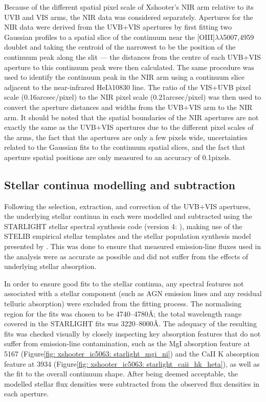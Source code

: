 Because of the different spatial pixel scale of Xshooter's NIR arm relative to its UVB and VIS arms, the NIR data was considered separately. Apertures for the NIR data were derived from the UVB+VIS apertures by first fitting two Gaussian profiles to a spatial slice of the continuum near the [OIII]$\lambda\lambda$5007,4959 doublet and taking the centroid of the narrowest to be the position of the continuum peak along the slit --- the distances from the centre of each UVB+VIS aperture to this continuum peak were then calculated. The same procedure was used to identify the continuum peak in the NIR arm using a continuum slice adjacent to the near-infrared HeI$\lambda$10830 line. The ratio of the VIS+UVB pixel scale (0.16\;arcsec/pixel) to the NIR pixel scale (0.21\;arcsec/pixel) was then used to convert the aperture distances and widths from the UVB+VIS arm to the NIR arm. It should be noted that the spatial boundaries of the NIR apertures are not exactly the same as the UVB+VIS apertures due to the different pixel scales of the arms, the fact that the apertures are only a few pixels wide, uncertainties related to the Gaussian fits to the continuum spatial slices, and the fact that aperture spatial positions are only measured to an accuracy of 0.1\;pixels.

\subsection{Stellar continua modelling and subtraction}
\label{section: xshooter_ic_5063: observations_and_data_reduction: starlight}

Following the selection, extraction, and correction of the UVB+VIS apertures, the underlying stellar continua in each were modelled and subtracted using the \textsc{STARLIGHT} stellar spectral synthesis code (version 4: \citealt{CidFernandes2005, Mateus2006}), making use of the \textsc{STELIB} empirical stellar templates \citep{LeBorgne2003} and the stellar population synthesis model presented by \citet{Bruzual2003}. This was done to ensure that measured emission-line fluxes used in the analysis were as accurate as possible and did not suffer from the effects of underlying stellar absorption.

In order to ensure good fits to the stellar continua, any spectral features not associated with a stellar component (such as AGN emission lines and any residual telluric absorption) were excluded from the fitting process. The normalising region for the fits was chosen to be 4740--4780{\;\AA}; the total wavelength range covered in the \textsc{STARLIGHT} fits was 3220--8000{\;\AA}. The adequacy of the resulting fits was checked visually by closely inspecting key absorption features that do not suffer from emission-line contamination, such as the MgI absorption feature at 5167\;{\AA} (Figure\;\ref{fig: xshooter_ic5063: starlight_mgi_ni}) and the CaII K absorption feature at 3934\;{\AA} (Figure\;\ref{fig: xshooter_ic5063: starlight_caii_hk_heta}), as well as the fit to the overall continuum shape. After being deemed acceptable, the modelled stellar flux densities were subtracted from the observed flux densities in each aperture. 

